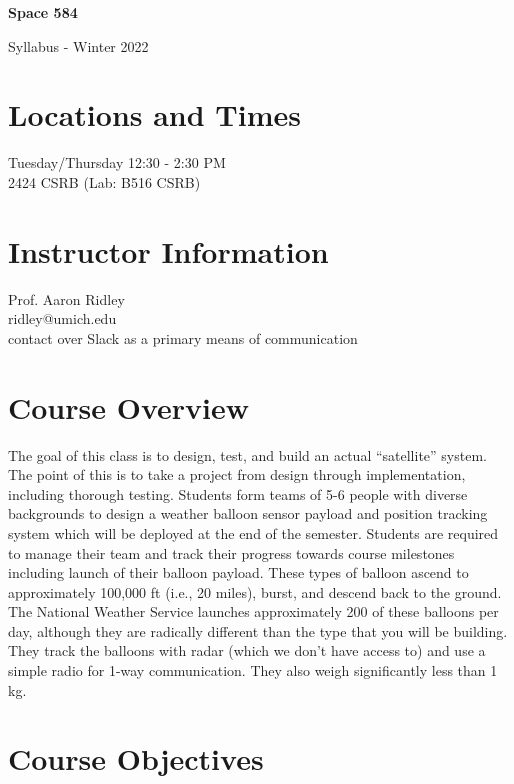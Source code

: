 \documentclass[11pt]{article}
\begin{document}
\begin{center}
{\bf \Large Space 584 

Syllabus - Winter 2022
}
\end{center}



\section{Locations and Times}

Tuesday/Thursday 12:30 - 2:30 PM \\
2424 CSRB (Lab: B516 CSRB)

\section{Instructor Information}

Prof. Aaron Ridley\\
ridley@umich.edu\\
contact over Slack as a primary means of communication

\section{Course Overview}

The goal of this class is to design, test, and build an actual
``satellite'' system.  The point of this is to take a project from
design through implementation, including thorough testing.  Students
form teams of 5-6 people with diverse backgrounds to design a weather
balloon sensor payload and position tracking system which will be
deployed at the end of the semester.  Students are required to manage
their team and track their progress towards course milestones
including launch of their balloon payload.  These types of balloon
ascend to approximately 100,000 ft (i.e., 20 miles), burst, and
descend back to the ground. The National Weather Service launches
approximately 200 of these balloons per day, although they are
radically different than the type that you will be building. They
track the balloons with radar (which we don’t have access to) and use
a simple radio for 1-way communication. They also weigh significantly
less than 1 kg.

\section{Course Objectives}
\end{document}
